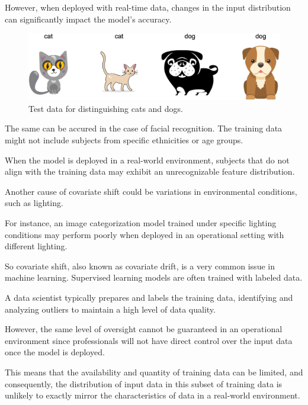 However, when deployed with real-time data, changes in the input distribution can significantly impact the model's accuracy.
		
	\vspace{1cm}
	\begin{figure}[H]
		\centering
		\includegraphics[width=1\textwidth]{assets/cat-dog-test.png} 
		\caption{Test data for distinguishing cats and dogs.}
		\label{fig:cani-gatti-ts}
	\end{figure}
	\vspace{1cm}
	
The same can be accured in the case of facial recognition. The training data might not include subjects from specific ethnicities or age groups.

When the model is deployed in a real-world environment, subjects that do not align with the training data may exhibit an unrecognizable feature distribution. 

Another cause of covariate shift could be variations in environmental conditions, such as lighting.

For instance, an image categorization model trained under specific lighting conditions may perform poorly when deployed in an operational setting with different lighting.
	
	\vspace{0.5cm}
	
So covariate shift, also known as covariate drift, is a very common issue in machine learning. Supervised learning models are often trained with labeled data. 

A data scientist typically prepares and labels the training data, identifying and analyzing outliers to maintain a high level of data quality.

However, the same level of oversight cannot be guaranteed in an operational environment since professionals will not have direct control over the input data once the model is deployed.

This means that the availability and quantity of training data can be limited, and consequently, the distribution of input data in this subset of training data is unlikely to exactly mirror the characteristics of data in a real-world environment.

